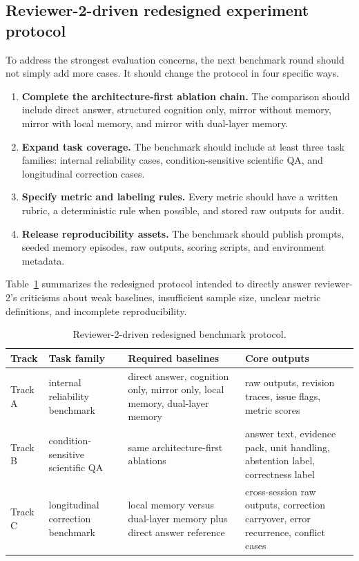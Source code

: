 \documentclass[12pt]{article}
\begin{document}
\subsection{Reviewer-2-driven redesigned experiment protocol}

To address the strongest evaluation concerns, the next benchmark round should not simply add more cases. It should change the protocol in four specific ways.

\begin{enumerate}[leftmargin=1.4em]
\item \textbf{Complete the architecture-first ablation chain.} The comparison should include direct answer, structured cognition only, mirror without memory, mirror with local memory, and mirror with dual-layer memory.
\item \textbf{Expand task coverage.} The benchmark should include at least three task families: internal reliability cases, condition-sensitive scientific QA, and longitudinal correction cases.
\item \textbf{Specify metric and labeling rules.} Every metric should have a written rubric, a deterministic rule when possible, and stored raw outputs for audit.
\item \textbf{Release reproducibility assets.} The benchmark should publish prompts, seeded memory episodes, raw outputs, scoring scripts, and environment metadata.
\end{enumerate}

Table~\ref{tab:redesigned-benchmark-v3} summarizes the redesigned protocol intended to directly answer reviewer-2's criticisms about weak baselines, insufficient sample size, unclear metric definitions, and incomplete reproducibility.

\begin{table}[H]
\centering
\begin{tabular}{p{2.0cm}p{3.3cm}p{3.4cm}p{4.0cm}}
\toprule
Track & Task family & Required baselines & Core outputs \\
\midrule
Track A & internal reliability benchmark & direct answer, cognition only, mirror only, local memory, dual-layer memory & raw outputs, revision traces, issue flags, metric scores \\
Track B & condition-sensitive scientific QA & same architecture-first ablations & answer text, evidence pack, unit handling, abstention label, correctness label \\
Track C & longitudinal correction benchmark & local memory versus dual-layer memory plus direct answer reference & cross-session raw outputs, correction carryover, error recurrence, conflict cases \\
\bottomrule
\end{tabular}
\caption{Reviewer-2-driven redesigned benchmark protocol.}
\label{tab:redesigned-benchmark-v3}
\end{table}
\end{document}
